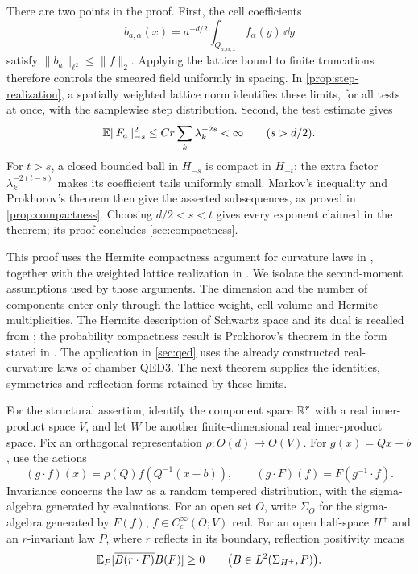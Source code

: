\documentclass[11pt,letterpaper,reqno]{amsart}
\begin{document}
There are two points in the proof. First, the cell coefficients
\begin{equation}\label{eq:cell-coefficients}
 b_{a,\alpha}(x)=a^{-d/2}\int_{Q_{a,\alpha,x}}f_\alpha(y)\,\dd y
\end{equation}
satisfy $\|b_a\|_{\ell^2}\le\|f\|_2$. Applying the lattice
bound to finite truncations therefore controls the smeared field
uniformly in spacing. In \cref{prop:step-realization}, a spatially
weighted lattice norm identifies these limits, for all tests at
once, with the samplewise step distribution. Second, the test estimate gives
\[
 \mathbb E\|F_a\|_{-s}^2\le Cr\sum_k\lambda_k^{-2s}<\infty
 \qquad(s>d/2).
\]
For $t>s$, a closed bounded ball in $H_{-s}$ is compact in $H_{-t}$:
the extra factor $\lambda_k^{-2(t-s)}$ makes its coefficient tails
uniformly small. Markov's inequality and Prokhorov's theorem then
give the asserted subsequences, as proved in \cref{prop:compactness}.
Choosing $d/2<s<t$ gives every exponent claimed in the theorem;
its proof concludes \cref{sec:compactness}.

This proof uses the Hermite compactness argument for curvature laws
in \cite[Sections~5.4 and~6.2]{QED3Manuscript}, together with the
weighted lattice realization in
\cite[Sections~5.3 and~6.1]{LatticeLimits}. We isolate the
second-moment assumptions used by those arguments. The dimension
and the number of components enter only through the lattice weight,
cell volume and Hermite multiplicities. The Hermite description of
Schwartz space and its dual is recalled from
\cite[Sections~2, 4 and~5]{RadhaThangavelu}; the probability compactness
result is Prokhorov's theorem in the form stated in
\cite[Theorem~1.1]{Sorensen}. The application in \cref{sec:qed}
uses the already constructed real-curvature laws of chamber QED3.
The next theorem supplies the identities, symmetries and reflection
forms retained by these limits.

For the structural assertion, identify the component space $\mathbb R^r$ with a real inner-product space \(V\), and let \(W\) be another
finite-dimensional real inner-product space.
Fix an orthogonal representation \(\rho:O(d)\to O(V)\).
For \(g(x)=Qx+b\), use the actions
\begin{equation}\label{eq:geometric-action}
 (g\cdot f)(x)=\rho(Q)f(Q^{-1}(x-b)),\qquad
 (g\cdot F)(f)=F(g^{-1}\cdot f).
\end{equation}
Invariance concerns the law as a random tempered distribution,
with the sigma-algebra generated by evaluations.
For an open set \(O\), write \(\Sigma_O\) for the sigma-algebra
generated by \(F(f)\), \(f\in C_c^\infty(O;V)\) real.
For an open half-space \(H^+\) and an \(r\)-invariant law \(P\),
where \(r\) reflects in its
boundary, reflection positivity means
\[
 \mathbb E_P[\overline{B(r\cdot F)}B(F)]\ge0
 \qquad\bigl(B\in L^2(\Sigma_{H^+},P)\bigr).
\]
\end{document}
